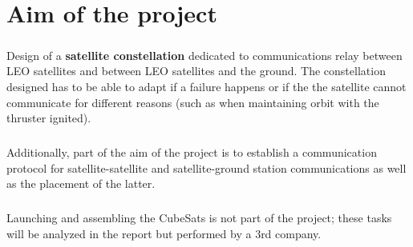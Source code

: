 \chapter{Aim of the project}
\paragraph{}Design of a \textbf{satellite constellation} dedicated to  communications relay between LEO satellites and between LEO satellites and the ground. The constellation designed has to be able to adapt if a failure happens or if the the satellite cannot communicate for different reasons (such as when maintaining orbit with the thruster ignited).
\paragraph{}Additionally, part of the aim of the project is to establish a communication protocol for satellite-satellite and satellite-ground station communications as well as the placement of the latter. 
\paragraph{}Launching and assembling the CubeSats is not part of the project; these tasks will be analyzed in the report but performed by a 3rd company. 